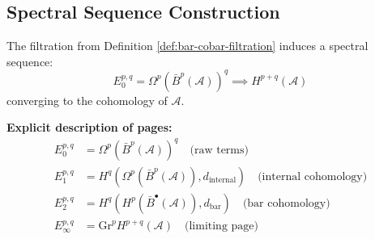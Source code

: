 \subsection{Spectral Sequence Construction}

\begin{theorem}\label{thm:bar-cobar-spectral-sequence}
The filtration from Definition \ref{def:bar-cobar-filtration} induces a spectral 
sequence:
$$E_0^{p,q} = \Omega^p(\bar{B}^p(\mathcal{A}))^q \implies H^{p+q}(\mathcal{A})$$
converging to the cohomology of $\mathcal{A}$.

\textbf{Explicit description of pages:}
\begin{align*}
E_0^{p,q} &= \Omega^p(\bar{B}^p(\mathcal{A}))^q \quad \text{(raw terms)} \\
E_1^{p,q} &= H^q(\Omega^p(\bar{B}^p(\mathcal{A})), d_{\text{internal}}) 
            \quad \text{(internal cohomology)} \\
E_2^{p,q} &= H^q(H^p(\bar{B}^\bullet(\mathcal{A})), d_{\text{bar}}) 
            \quad \text{(bar cohomology)} \\
E_\infty^{p,q} &= \text{Gr}^p H^{p+q}(\mathcal{A}) \quad \text{(limiting page)}
\end{align*}
\end{theorem}

